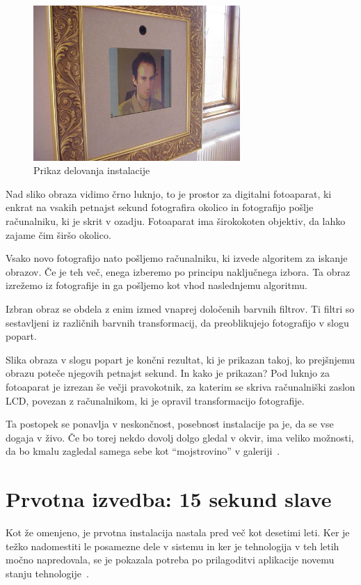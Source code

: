 \documentclass[a4paper, 12pt]{book}
\begin{document}
\begin{figure}
    \centering
    \includegraphics[width=0.7\textwidth]{15sec}
    \caption{Prikaz delovanja instalacije}
    \label{fig:15sec}
\end{figure}

Nad sliko obraza vidimo črno luknjo, to je prostor za digitalni fotoaparat, ki
enkrat na vsakih petnajst sekund fotografira okolico in fotografijo pošlje
računalniku, ki je skrit v ozadju. Fotoaparat ima širokokoten objektiv, da
lahko zajame čim širšo okolico.

Vsako novo fotografijo nato pošljemo računalniku, ki izvede algoritem za
iskanje obrazov. Če je teh več, enega izberemo po principu naključnega
izbora. Ta obraz izrežemo iz fotografije in ga pošljemo kot vhod
naslednjemu algoritmu.

Izbran obraz se obdela z enim izmed vnaprej določenih barvnih filtrov. Ti
filtri so sestavljeni iz različnih barvnih transformacij, da preoblikujejo
fotografijo v slogu popart.

Slika obraza v slogu popart je končni rezultat, ki je prikazan takoj, ko
prejšnjemu obrazu poteče njegovih petnajst sekund. In kako je prikazan? Pod
luknjo za fotoaparat je izrezan še večji pravokotnik, za katerim se skriva
računalniški zaslon LCD, povezan z računalnikom, ki je opravil
transformacijo fotografije.

Ta postopek se ponavlja v neskončnost, posebnost instalacije pa je, da se vse
dogaja v živo. Če bo torej nekdo dovolj dolgo gledal v okvir, ima veliko
možnosti, da bo kmalu zagledal samega sebe kot ``mojstrovino'' v
galeriji~\cite{lieser2010world}.


\chapter{Prvotna izvedba: 15 sekund slave}
\label{ch:prvotnaIzvedba15}
Kot že omenjeno, je prvotna instalacija nastala pred več kot desetimi leti. Ker
je težko nadomestiti le posamezne dele v sistemu in ker je tehnologija v teh
letih močno napredovala, se je pokazala potreba po prilagoditvi aplikacije
novemu stanju tehnologije~\cite{trifonova}.
\end{document}
